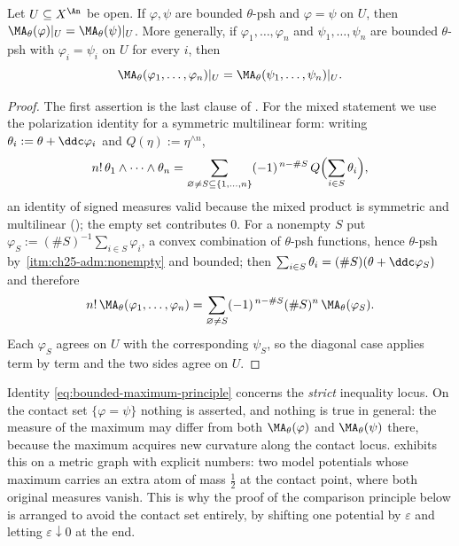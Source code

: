 \begin{corollary}
\label{cor:ch25-locality}
Let $U\subseteq X^{\An}$ be open.  If $\varphi,\psi$ are bounded
$\theta$-psh and $\varphi=\psi$ on $U$, then
$\MA_\theta(\varphi)|_U=\MA_\theta(\psi)|_U$.  More generally, if
$\varphi_1,\ldots,\varphi_n$ and $\psi_1,\ldots,\psi_n$ are bounded
$\theta$-psh with $\varphi_i=\psi_i$ on $U$ for every $i$, then
\[
 \MA_\theta(\varphi_1,\ldots,\varphi_n)|_U
 =\MA_\theta(\psi_1,\ldots,\psi_n)|_U .
\]
\end{corollary}

\begin{proof}
The first assertion is the last clause of
.  For the mixed statement we use the
polarization identity for a symmetric multilinear form: writing
$\theta_i:=\theta+\ddc\varphi_i$ and $Q(\eta):=\eta^{\wedge n}$,
\[
 n!\,\theta_1\wedge\cdots\wedge\theta_n
 =\sum_{\varnothing\neq S\subseteq\{1,\ldots,n\}}(-1)^{\,n-\#S}\,
   Q\Bigl(\sum_{i\in S}\theta_i\Bigr),
\]
an identity of signed measures valid because the mixed product is symmetric
and multilinear (); the empty set
contributes $0$.  For a nonempty $S$ put
$\varphi_S:=(\#S)^{-1}\sum_{i\in S}\varphi_i$, a convex combination of
$\theta$-psh functions, hence $\theta$-psh by
\,\cref{itm:ch25-adm:nonempty} and bounded;
then $\sum_{i\in S}\theta_i=(\#S)(\theta+\ddc\varphi_S)$ and therefore
\[
 n!\,\MA_\theta(\varphi_1,\ldots,\varphi_n)
 =\sum_{\varnothing\neq S}(-1)^{\,n-\#S}(\#S)^n\,
    \MA_\theta(\varphi_S).
\]
Each $\varphi_S$ agrees on $U$ with the corresponding $\psi_S$, so the
diagonal case applies term by term and the two sides agree on $U$.
\end{proof}

\begin{remark}
\label{rem:ch25-max-sets}
Identity \eqref{eq:bounded-maximum-principle} concerns the \emph{strict}
inequality locus.  On the contact set $\{\varphi=\psi\}$ nothing is
asserted, and nothing is true in general: the measure of the maximum may
differ from both $\MA_\theta(\varphi)$ and $\MA_\theta(\psi)$ there,
because the maximum acquires new curvature along the contact locus.
 exhibits this on a metric graph with
explicit numbers: two model potentials whose maximum carries an extra atom
of mass $\tfrac12$ at the contact point, where both original measures
vanish.  This is why the proof of the comparison
principle below is arranged to avoid the contact set entirely, by shifting
one potential by $\varepsilon$ and letting $\varepsilon\downarrow0$ at
the end.
\end{remark}

